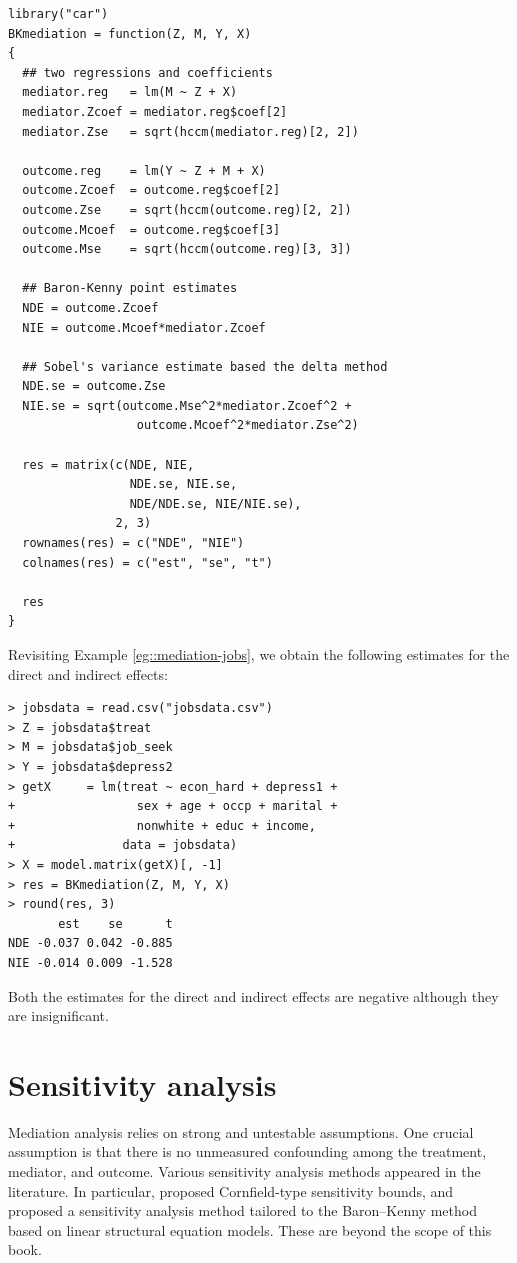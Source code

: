  \begin{lstlisting}
library("car")
BKmediation = function(Z, M, Y, X)
{
  ## two regressions and coefficients
  mediator.reg   = lm(M ~ Z + X)
  mediator.Zcoef = mediator.reg$coef[2]
  mediator.Zse   = sqrt(hccm(mediator.reg)[2, 2])
  
  outcome.reg    = lm(Y ~ Z + M + X)
  outcome.Zcoef  = outcome.reg$coef[2]
  outcome.Zse    = sqrt(hccm(outcome.reg)[2, 2])
  outcome.Mcoef  = outcome.reg$coef[3]
  outcome.Mse    = sqrt(hccm(outcome.reg)[3, 3])
  
  ## Baron-Kenny point estimates
  NDE = outcome.Zcoef
  NIE = outcome.Mcoef*mediator.Zcoef
  
  ## Sobel's variance estimate based the delta method
  NDE.se = outcome.Zse
  NIE.se = sqrt(outcome.Mse^2*mediator.Zcoef^2 + 
                  outcome.Mcoef^2*mediator.Zse^2)
  
  res = matrix(c(NDE, NIE, 
                 NDE.se, NIE.se,
                 NDE/NDE.se, NIE/NIE.se), 
               2, 3)
  rownames(res) = c("NDE", "NIE")
  colnames(res) = c("est", "se", "t")
  
  res
}
 \end{lstlisting}
 
 
 Revisiting Example  \ref{eg::mediation-jobs}, we obtain the following estimates for the direct and indirect effects:
 
 \begin{lstlisting}
> jobsdata = read.csv("jobsdata.csv")
> Z = jobsdata$treat
> M = jobsdata$job_seek
> Y = jobsdata$depress2
> getX     = lm(treat ~ econ_hard + depress1 + 
+                 sex + age + occp + marital + 
+                 nonwhite + educ + income,
+               data = jobsdata)
> X = model.matrix(getX)[, -1]
> res = BKmediation(Z, M, Y, X)
> round(res, 3)
       est    se      t
NDE -0.037 0.042 -0.885
NIE -0.014 0.009 -1.528
\end{lstlisting}

Both the estimates for the direct and indirect effects are negative although they are insignificant. 



\section{Sensitivity analysis}


Mediation analysis relies on strong and untestable assumptions. One crucial assumption is that there is no unmeasured confounding among the treatment, mediator, and outcome. Various sensitivity analysis methods appeared in the literature. In particular, \citet{ding2016sharp} proposed Cornfield-type sensitivity bounds, and \citet{zhang2022interpretable} proposed a sensitivity analysis method tailored to the Baron--Kenny method based on linear structural equation models. These are beyond the scope of this book.  





